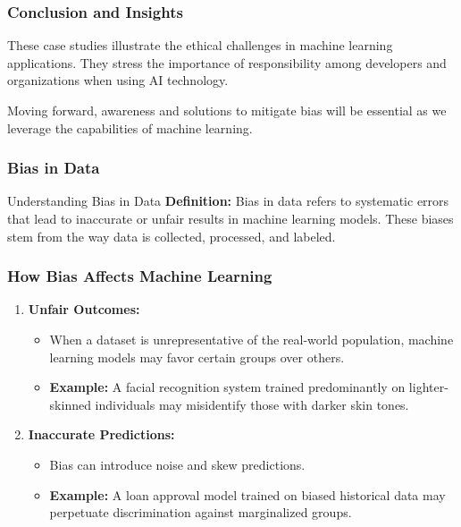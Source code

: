 \documentclass[aspectratio=169]{beamer}
\begin{document}
\begin{frame}[fragile]
    \frametitle{Conclusion and Insights}
    These case studies illustrate the ethical challenges in machine learning applications. They stress the importance of responsibility among developers and organizations when using AI technology. 

    Moving forward, awareness and solutions to mitigate bias will be essential as we leverage the capabilities of machine learning.
\end{frame}

\begin{frame}[fragile]
    \frametitle{Bias in Data}
    \begin{block}{Understanding Bias in Data}
        \textbf{Definition:} Bias in data refers to systematic errors that lead to inaccurate or unfair results in machine learning models. These biases stem from the way data is collected, processed, and labeled.
    \end{block}
\end{frame}

\begin{frame}[fragile]
    \frametitle{How Bias Affects Machine Learning}
    \begin{enumerate}
        \item \textbf{Unfair Outcomes:}
            \begin{itemize}
                \item When a dataset is unrepresentative of the real-world population, machine learning models may favor certain groups over others.
                \item \textbf{Example:} A facial recognition system trained predominantly on lighter-skinned individuals may misidentify those with darker skin tones.
            \end{itemize}

        \item \textbf{Inaccurate Predictions:}
            \begin{itemize}
                \item Bias can introduce noise and skew predictions.
                \item \textbf{Example:} A loan approval model trained on biased historical data may perpetuate discrimination against marginalized groups.
            \end{itemize}
    \end{enumerate}
\end{frame}
\end{document}
